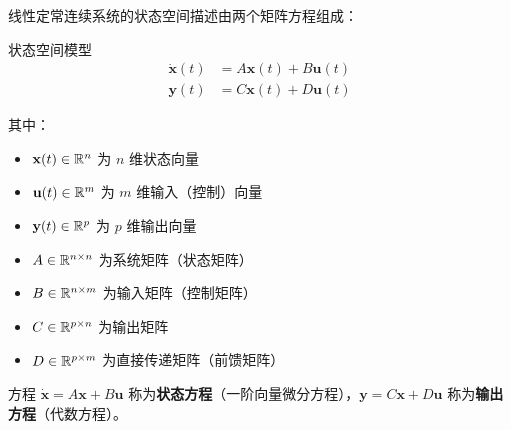 线性定常连续系统的状态空间描述由两个矩阵方程组成：

\begin{mydefinition}{状态空间模型}
\begin{align}
    \dot{\mathbf{x}}(t) &= A\mathbf{x}(t) + B\mathbf{u}(t) \\
    \mathbf{y}(t) &= C\mathbf{x}(t) + D\mathbf{u}(t)
\end{align}

其中：
\begin{itemize}
    \item $\mathbf{x}(t) \in \mathbb{R}^n$ 为 $n$ 维状态向量
    \item $\mathbf{u}(t) \in \mathbb{R}^m$ 为 $m$ 维输入（控制）向量
    \item $\mathbf{y}(t) \in \mathbb{R}^p$ 为 $p$ 维输出向量
    \item $A \in \mathbb{R}^{n \times n}$ 为系统矩阵（状态矩阵）
    \item $B \in \mathbb{R}^{n \times m}$ 为输入矩阵（控制矩阵）
    \item $C \in \mathbb{R}^{p \times n}$ 为输出矩阵
    \item $D \in \mathbb{R}^{p \times m}$ 为直接传递矩阵（前馈矩阵）
\end{itemize}
\end{mydefinition}

方程 $\dot{\mathbf{x}} = A\mathbf{x} + B\mathbf{u}$ 称为\textbf{状态方程}（一阶向量微分方程），$\mathbf{y} = C\mathbf{x} + D\mathbf{u}$ 称为\textbf{输出方程}（代数方程）。

